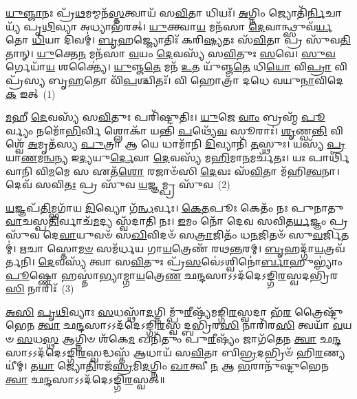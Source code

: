 \setcounter{anuvakam}{0}
\-\ul{𑌯𑍁}\-\-\ul{𑌞𑍍𑌜𑌾}\-𑌨𑌃 𑌪𑍍𑌰᳴\-\ul{𑌥}\-𑌮𑌮𑍍𑌮𑌨᳴\-\ul{𑌸𑍍𑌤}\-𑌤𑍍𑌵𑌾𑌯᳴ 𑌸\-\ul{𑌵𑌿}\-𑌤𑌾 𑌧𑌿𑌯𑌃᳴। \ul{𑌅}\-𑌗𑍍𑌨𑌿𑌂 𑌜𑍍𑌯𑍋𑌤𑌿᳴\-\ul{𑌰𑍍𑌨𑌿}\-𑌚𑌾𑌯𑍍𑌯᳴ 𑌪𑍃\-\ul{𑌥𑌿}\-𑌵𑍍𑌯𑌾 𑌅𑌧𑍍𑌯𑌾𑌭᳴𑌰𑌤𑍍। \ul{𑌯𑍁}\-𑌕𑍍𑌤𑍍𑌵𑌾\-\ul{𑌯} 𑌮𑌨᳴𑌸𑌾 \ul{𑌦𑍇}\-𑌵𑌾𑌨𑍍𑌥𑍍𑌸𑍁𑌵᳴\-\ul{𑌰𑍍𑌯}\-𑌤𑍋 \ul{𑌧𑌿}\-𑌯𑌾 𑌦𑌿𑌵𑌮𑍍॑। \ul{𑌬𑍃}\-𑌹𑌜𑍍𑌜𑍍𑌯𑍋𑌤𑌿𑌃᳴ 𑌕𑌰𑌿\-\ul{𑌷𑍍𑌯}\-𑌤𑌃 𑌸᳴\-\ul{𑌵𑌿}\-𑌤𑌾 𑌪𑍍𑌰 𑌸𑍁᳴𑌵\-\ul{𑌤𑌿} 𑌤𑌾𑌨𑍍। \ul{𑌯𑍁}\-𑌕𑍍𑌤𑍇\-\ul{𑌨} 𑌮𑌨᳴𑌸𑌾 \ul{𑌵}\-𑌯𑌂 \ul{𑌦𑍇}\-𑌵𑌸𑍍𑌯᳴ 𑌸\-\ul{𑌵𑌿}\-𑌤𑍁𑌃 \ul{𑌸}\-𑌵𑍇। \ul{𑌸𑍁}\-\-\ul{𑌵}\-𑌰𑍍𑌗𑍇𑌯𑌾᳴\-\ul{𑌯} 𑌶𑌕𑍍𑌤𑍍𑌯𑍈॑। \ul{𑌯𑍁}\-𑌞𑍍𑌜\-\ul{𑌤𑍇} 𑌮𑌨᳴ \ul{𑌉}\-𑌤 𑌯𑍁᳴𑌞𑍍𑌜\-\ul{𑌤𑍇} 𑌧𑌿\-\ul{𑌯𑍋} 𑌵𑌿\-\ul{𑌪𑍍𑌰𑌾} 𑌵𑌿𑌪𑍍𑌰᳴𑌸𑍍𑌯 𑌬𑍃\-\ul{𑌹}\-𑌤𑍋 𑌵𑌿᳴\-\ul{𑌪}\-𑌶𑍍𑌚𑌿𑌤𑌃᳴। 𑌵𑌿 𑌹𑍋𑌤𑍍𑌰𑌾᳴ 𑌦𑌧𑍇 𑌵𑌯𑍁\-\ul{𑌨𑌾}\-𑌵𑌿𑌦𑍇\-\ul{𑌕} 𑌇𑌤𑍍~(1)

\-\ul{𑌮}\-𑌹𑍀 \ul{𑌦𑍇}\-𑌵𑌸𑍍𑌯᳴ 𑌸\-\ul{𑌵𑌿}\-𑌤𑍁𑌃 𑌪𑌰𑌿᳴𑌷𑍍𑌟𑍁𑌤𑌿𑌃। \ul{𑌯𑍁}\-𑌜𑍇 \ul{𑌵𑌾𑌂} 𑌬𑍍𑌰𑌹𑍍𑌮᳴ \ul{𑌪𑍂}\-𑌰𑍍𑌵𑍍𑌯𑌂 𑌨𑌮𑍋᳴\-\ul{𑌭𑌿}\-𑌰𑍍𑌵𑌿 𑌶𑍍𑌲𑍋𑌕𑌾᳴ 𑌯𑌨𑍍𑌤𑌿 \ul{𑌪}\-𑌥𑍍𑌯𑍇᳴\-\ul{𑌵} 𑌸𑍂𑌰𑌾𑌃॑। \ul{𑌶𑍃}\-𑌣𑍍𑌵\-\ul{𑌨𑍍𑌤𑌿} 𑌵𑌿𑌶𑍍𑌵𑍇᳴ \ul{𑌅}\-𑌮𑍃𑌤᳴𑌸𑍍𑌯 \ul{𑌪𑍁}\-𑌤𑍍𑌰𑌾 𑌆 𑌯𑍇 𑌧𑌾𑌮𑌾᳴𑌨𑌿 \ul{𑌦𑌿}\-𑌵𑍍𑌯𑌾𑌨𑌿᳴ \ul{𑌤}\-𑌸𑍍𑌥𑍁𑌃। 𑌯𑌸𑍍𑌯᳴ \ul{𑌪𑍍𑌰}\-𑌯𑌾\-\ul{𑌣}\-𑌮\-\ul{𑌨𑍍𑌵}\-𑌨𑍍𑌯 𑌇\-\ul{𑌦𑍍𑌯}\-𑌯𑍁\-\ul{𑌰𑍍𑌦𑍇}\-𑌵𑌾 \ul{𑌦𑍇}\-𑌵𑌸𑍍𑌯᳴ 𑌮\-\ul{𑌹𑌿}\-𑌮𑌾\-\ul{𑌨}\-𑌮𑌰𑍍𑌚᳴𑌤𑌃। 𑌯𑌃 𑌪𑌾𑌰𑍍𑌥𑌿᳴𑌵𑌾𑌨𑌿 𑌵𑌿\-\ul{𑌮}\-𑌮𑍇 𑌸 𑌏𑌤᳴\-\ul{𑌶𑍋} 𑌰𑌜𑌾𑍞᳴𑌸𑌿 \ul{𑌦𑍇}\-𑌵𑌃 𑌸᳴\-\ul{𑌵𑌿}\-𑌤𑌾 𑌮᳴𑌹𑌿\-\ul{𑌤𑍍𑌵}\-𑌨𑌾। 𑌦𑍇𑌵᳴ 𑌸𑌵𑌿\-\ul{𑌤𑌃} 𑌪𑍍𑌰 𑌸𑍁᳴𑌵 \ul{𑌯}\-𑌜𑍍𑌞𑌮𑍍𑌪𑍍𑌰 𑌸𑍁᳴𑌵~(2)

\-\ul{𑌯}\-𑌜𑍍𑌞𑌪᳴\-\ul{𑌤𑌿}\-𑌮𑍍𑌭𑌗𑌾᳴𑌯 \ul{𑌦𑌿}\-𑌵𑍍𑌯𑍋 𑌗᳴\-\ul{𑌨𑍍𑌧}\-𑌰𑍍𑌵𑌃। \ul{𑌕𑍇}\-\-\ul{𑌤}\-𑌪𑍂𑌃 𑌕𑍇𑌤𑌂᳴ 𑌨𑌃 𑌪𑍁𑌨𑌾𑌤𑍁 \ul{𑌵𑌾}\-𑌚𑌸𑍍𑌪\-\ul{𑌤𑌿}\-𑌰𑍍𑌵𑌾𑌚᳴\-\ul{𑌮}\-𑌦𑍍𑌯 𑌸𑍍𑌵᳴𑌦𑌾𑌤𑌿 𑌨𑌃। \ul{𑌇}\-𑌮𑌂 𑌨𑍋᳴ 𑌦𑍇𑌵 𑌸𑌵𑌿𑌤\-\ul{𑌰𑍍𑌯}\-𑌜𑍍𑌞𑌂 𑌪𑍍𑌰 𑌸𑍁᳴𑌵 𑌦𑍇\-\ul{𑌵𑌾}\-𑌯𑍁𑌵𑍞᳴ 𑌸\-\ul{𑌖𑌿}\-𑌵𑌿𑌦𑍞᳴ 𑌸\-\ul{𑌤𑍍𑌰𑌾}\-𑌜𑌿𑌤𑌂᳴ 𑌧\-\ul{𑌨}\-𑌜𑌿𑌤𑍞᳴ 𑌸𑍁\-\ul{𑌵}\-𑌰𑍍𑌜𑌿𑌤𑌮𑍍॑। \ul{𑌋}\-𑌚𑌾 𑌸𑍍𑌤𑍋\-\ul{𑌮}\-\-\ul{𑍞} 𑌸𑌮᳴𑌰𑍍𑌧𑌯 𑌗𑌾\-\ul{𑌯}\-𑌤𑍍𑌰𑍇𑌣᳴ 𑌰𑌥\-\ul{𑌨𑍍𑌤}\-𑌰𑌮𑍍। \ul{𑌬𑍃}\-𑌹𑌦𑍍𑌗𑌾᳴\-\ul{𑌯}\-𑌤𑍍𑌰𑌵᳴𑌰𑍍𑌤𑌨𑌿। \ul{𑌦𑍇}\-𑌵𑌸𑍍𑌯᳴ 𑌤𑍍𑌵𑌾 𑌸\-\ul{𑌵𑌿}\-𑌤𑍁𑌃 𑌪𑍍𑌰᳴\-\ul{𑌸}\-𑌵𑍇॑\-𑌽𑌶𑍍𑌵𑌿𑌨𑍋॑\-\ul{𑌰𑍍𑌬𑌾}\-𑌹𑍁\-𑌭𑍍𑌯𑌾𑌂॑ \ul{𑌪𑍂}\-𑌷𑍍𑌣𑍋 𑌹𑌸𑍍𑌤𑌾॑𑌭𑍍𑌯𑌾𑌮𑍍𑌗𑌾\-\ul{𑌯}\-𑌤𑍍𑌰𑍇\-\ul{𑌣} 𑌛\-\ul{𑌨𑍍𑌦}\-𑌸𑌾\-𑌽\-𑌽𑌦᳴𑌦𑍇\-𑌽𑌙𑍍𑌗𑌿\-\ul{𑌰}\-𑌸𑍍𑌵𑌦𑌭𑍍𑌰𑌿᳴𑌰\-\ul{𑌸𑌿} 𑌨𑌾𑌰𑌿𑌃᳴~(3)

\-\ul{𑌅}\-\-\ul{𑌸𑌿} \ul{𑌪𑍃}\-\-\ul{𑌥𑌿}\-𑌵𑍍𑌯𑌾𑌃 \ul{𑌸}\-𑌧𑌸𑍍𑌥𑌾᳴\-\ul{𑌦}\-𑌗𑍍𑌨𑌿𑌮𑍍𑌪𑍁᳴\-\ul{𑌰𑍀}\-𑌷𑍍𑌯᳴𑌮𑌙𑍍𑌗𑌿\-\ul{𑌰}\-𑌸𑍍𑌵𑌦𑌾 𑌭᳴\-\ul{𑌰} 𑌤𑍍𑌰𑍈𑌷𑍍𑌟𑍁᳴𑌭𑍇𑌨 \ul{𑌤𑍍𑌵𑌾} 𑌛\-\ul{𑌨𑍍𑌦}\-𑌸𑌾\-𑌽\-𑌽𑌦᳴𑌦𑍇\-𑌽𑌙𑍍𑌗𑌿\-\ul{𑌰}\-𑌸𑍍𑌵𑌦𑍍𑌬𑌭𑍍𑌰𑌿᳴𑌰\-\ul{𑌸𑌿} 𑌨𑌾𑌰𑌿᳴𑌰\-\ul{𑌸𑌿} 𑌤𑍍𑌵𑌯𑌾᳴ \ul{𑌵}\-𑌯𑍞 \ul{𑌸}\-𑌧\-\ul{𑌸𑍍𑌥} 𑌆𑌗𑍍𑌨𑌿𑍞 𑌶᳴𑌕𑍇\-\ul{𑌮} 𑌖𑌨𑌿᳴𑌤𑍁𑌂 𑌪𑍁\-\ul{𑌰𑍀}\-𑌷𑍍𑌯𑌂᳴ 𑌜𑌾𑌗᳴𑌤𑍇𑌨 \ul{𑌤𑍍𑌵𑌾} 𑌛\-\ul{𑌨𑍍𑌦}\-𑌸𑌾\-𑌽\-𑌽𑌦᳴𑌦𑍇\-𑌽𑌙𑍍𑌗𑌿\-\ul{𑌰}\-𑌸𑍍𑌵𑌦𑍍𑌧𑌸𑍍𑌤᳴ \ul{𑌆}\-𑌧𑌾𑌯᳴ 𑌸\-\ul{𑌵𑌿}\-𑌤𑌾 𑌬𑌿\-\ul{𑌭𑍍𑌰}\-𑌦𑌭𑍍𑌰𑌿𑍞᳴ 𑌹𑌿\-\ul{𑌰}\-𑌣𑍍𑌯𑌯𑍀॑𑌮𑍍। 𑌤\-\ul{𑌯𑌾} 𑌜𑍍𑌯𑍋\-\ul{𑌤𑌿}\-𑌰𑌜᳴\-\ul{𑌸𑍍𑌰}\-𑌮𑌿\-\ul{𑌦}\-𑌗𑍍𑌨𑌿𑌂 \ul{𑌖𑌾}\-𑌤𑍍𑌵𑍀 \ul{𑌨} 𑌆 \ul{𑌭}\-𑌰𑌾𑌨𑍁᳴𑌷𑍍𑌟𑍁𑌭𑍇𑌨 \ul{𑌤𑍍𑌵𑌾} 𑌛\-\ul{𑌨𑍍𑌦}\-𑌸𑌾\-𑌽\-𑌽𑌦᳴𑌦𑍇\-𑌽𑌙𑍍𑌗𑌿\-\ul{𑌰}\-𑌸𑍍𑌵𑌤𑍍॥

